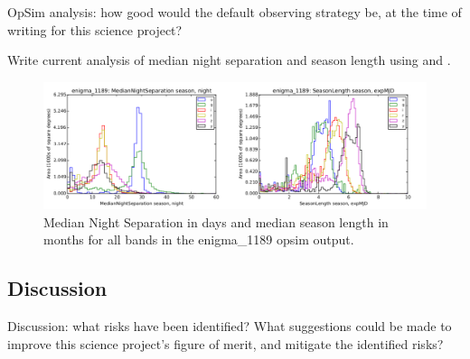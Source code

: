 OpSim analysis: how good would the default observing strategy be, at
the time of writing for this science project?

 Write current analysis of median night separation and season length using  and . 

\begin{center}
\begin{figure}
\includegraphics[width=\textwidth]{figs/agn/enigma_1189_NightSep_seasonLength.pdf}
\caption{Median Night Separation in days and median season length in months for all bands in the enigma\_1189 opsim output.}
\label{microfig}
\end{figure}
\end{center}


\subsection{Discussion}
\label{sec:\secname:discussion}

Discussion: what risks have been identified? What suggestions could be
made to improve this science project's figure of merit, and mitigate
the identified risks?



\navigationbar
